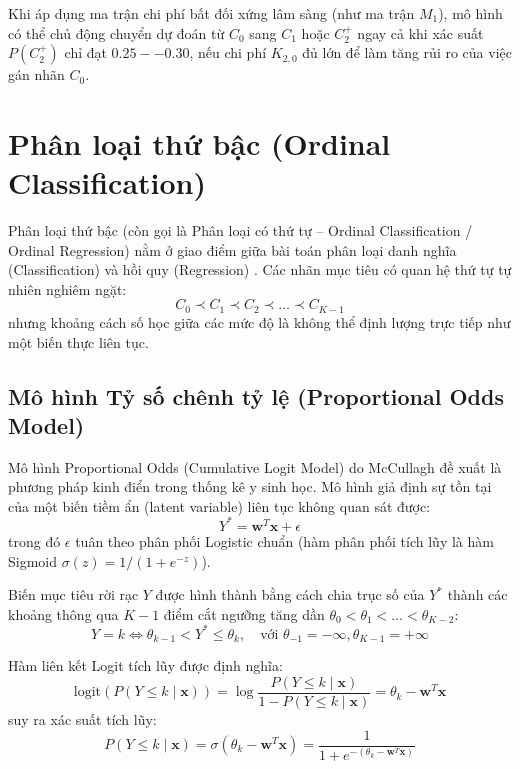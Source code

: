 Khi áp dụng ma trận chi phí bất đối xứng lâm sàng (như ma trận $M_1$), mô hình có thể chủ động chuyển dự đoán từ $C_0$ sang $C_1$ hoặc $C_2^+$ ngay cả khi xác suất $P(C_2^+)$ chỉ đạt $0.25--0.30$, nếu chi phí $K_{2,0}$ đủ lớn để làm tăng rủi ro của việc gán nhãn $C_0$.

\section{Phân loại thứ bậc (Ordinal Classification)}
\label{sec:ly-thuyet-ordinal}

Phân loại thứ bậc (còn gọi là Phân loại có thứ tự -- Ordinal Classification / Ordinal Regression) nằm ở giao điểm giữa bài toán phân loại danh nghĩa (Classification) và hồi quy (Regression) \cite{mccullagh1980regression, frank2001simple}. Các nhãn mục tiêu có quan hệ thứ tự tự nhiên nghiêm ngặt:
\begin{equation}
    C_0 \prec C_1 \prec C_2 \prec \dots \prec C_{K-1}
\end{equation}
nhưng khoảng cách số học giữa các mức độ là không thể định lượng trực tiếp như một biến thực liên tục.

\subsection{Mô hình Tỷ số chênh tỷ lệ (Proportional Odds Model)}
Mô hình Proportional Odds (Cumulative Logit Model) do McCullagh đề xuất \cite{mccullagh1980regression} là phương pháp kinh điển trong thống kê y sinh học. Mô hình giả định sự tồn tại của một biến tiềm ẩn (latent variable) liên tục không quan sát được:
\begin{equation}
    Y^* = \mathbf{w}^T \mathbf{x} + \epsilon
\end{equation}
trong đó $\epsilon$ tuân theo phân phối Logistic chuẩn (hàm phân phối tích lũy là hàm Sigmoid $\sigma(z) = 1/(1+e^{-z})$).

Biến mục tiêu rời rạc $Y$ được hình thành bằng cách chia trục số của $Y^*$ thành các khoảng thông qua $K-1$ điểm cắt ngưỡng tăng dần $\theta_0 < \theta_1 < \dots < \theta_{K-2}$:
\begin{equation}
    Y = k \iff \theta_{k-1} < Y^* \le \theta_k, \quad \text{với } \theta_{-1} = -\infty, \theta_{K-1} = +\infty
\end{equation}

Hàm liên kết Logit tích lũy được định nghĩa:
\begin{equation}
    \text{logit}(P(Y \le k \mid \mathbf{x})) = \log \frac{P(Y \le k \mid \mathbf{x})}{1 - P(Y \le k \mid \mathbf{x})} = \theta_k - \mathbf{w}^T \mathbf{x}
\end{equation}
suy ra xác suất tích lũy:
\begin{equation}
    P(Y \le k \mid \mathbf{x}) = \sigma(\theta_k - \mathbf{w}^T \mathbf{x}) = \frac{1}{1 + e^{-(\theta_k - \mathbf{w}^T \mathbf{x})}}
\end{equation}

